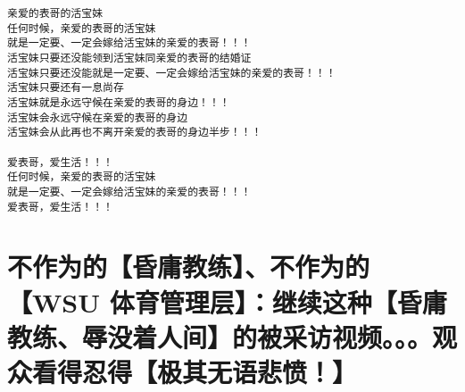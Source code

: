 \documentclass[9pt, b5paper]{article}
\begin{document}
\begin{verbatim}
亲爱的表哥的活宝妹
任何时候，亲爱的表哥的活宝妹
就是一定要、一定会嫁给活宝妹的亲爱的表哥！！！
活宝妹只要还没能领到活宝妹同亲爱的表哥的结婚证
活宝妹只要还没能就是一定要、一定会嫁给活宝妹的亲爱的表哥！！！
活宝妹只要还有一息尚存
活宝妹就是永远守候在亲爱的表哥的身边！！！
活宝妹会永远守候在亲爱的表哥的身边
活宝妹会从此再也不离开亲爱的表哥的身边半步！！！

爱表哥，爱生活！！！
任何时候，亲爱的表哥的活宝妹
就是一定要、一定会嫁给活宝妹的亲爱的表哥！！！
爱表哥，爱生活！！！
\end{verbatim}


\section{不作为的【昏庸教练】、不作为的【WSU 体育管理层】：继续这种【昏庸教练、辱没着人间】的被采访视频。。。观众看得忍得【极其无语悲愤！】}
\label{sec-16}
\end{document}
